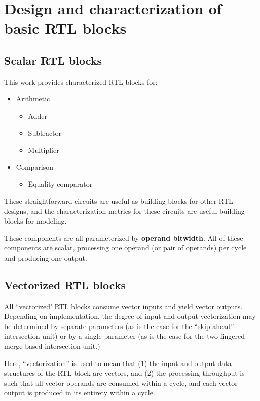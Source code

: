 \chapter{Design and characterization of basic RTL blocks}
\label{chapter:rtl}

\section{Scalar RTL blocks}

This work provides characterized RTL blocks for:

\begin{itemize}
    \item Arithmetic

    \begin{itemize}
        \item Adder
        \item Subtractor
        \item Multiplier
    \end{itemize}
    
    \item Comparison

    \begin{itemize}
        \item Equality comparator
    \end{itemize}
\end{itemize}

These straightforward circuits are useful as building blocks for other RTL designs, and the characterization metrics for these circuits are useful building-blocks for modeling.

These components are all parameterized by \textbf{operand bitwidth}. All of these components are scalar, processing one operand (or pair of operands) per cycle and producing one output.

\section{Vectorized RTL blocks}

All ``vectorized' RTL blocks consume vector inputs and yield vector outputs. Depending on implementation, the degree of input and output vectorization may be determined by separate parameters (as is the case for the ``skip-ahead'' intersection unit) or by a single parameter (as is the case for the two-fingered merge-based intersection unit.)

Here, ``vectorization'' is used to mean that (1) the input and output data structures of the RTL block are vectors, and (2) the processing throughput is such that all vector operands are consumed within a cycle, and each vector output is produced in its entirety within a cycle.

